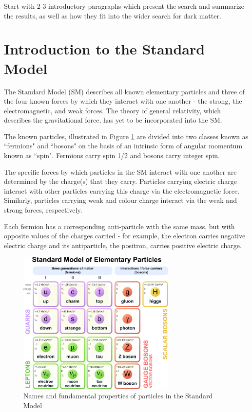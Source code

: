 \label{chapter:introduction}

Start with 2-3 introductory paragraphs which present the search and summarize the results, as well as how they fit into the wider search for dark matter. 

\section{Introduction to the Standard Model}

The Standard Model (SM) describes all known elementary particles and three of the four known forces by which they interact with one another - the strong, the electromagnetic, and weak forces. The theory of general relativity, which describes the gravitational force, has yet to be incorporated into the SM. 

The known particles, illustrated in Figure \ref{fig:standard_model} are divided into two classes known as ``fermions" and ``bosons" on the basis of an intrinsic form of angular momentum known as ``spin". Fermions carry spin 1/2 and bosons carry integer spin. 

The specific forces by which particles in the SM interact with one another are determined by the charge(s) that they carry. Particles carrying electric charge interact with other particles carrying this charge via the electromagnetic force. Similarly, particles carrying weak and colour charge interact via the weak and strong forces, respectively. 

Each fermion has a corresponding anti-particle with the same mass, but with opposite values of the charges carried - for example, the electron carries negative electric charge and its antiparticle, the positron, carries positive electric charge. 

\begin{figure}[H]
	\centering
	\includegraphics[width=0.7\textwidth]{Figures/1/StandardModel.pdf}
	\caption[]{Names and fundamental properties of particles in the Standard Model}
	\label{fig:standard_model}
\end{figure}

